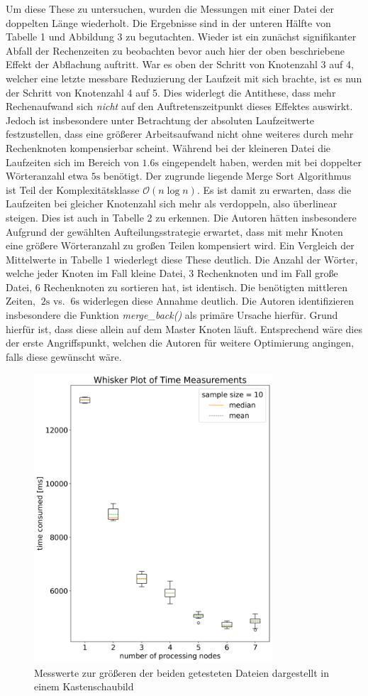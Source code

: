 Um diese These zu untersuchen, wurden die Messungen mit einer Datei der doppelten Länge wiederholt. Die Ergebnisse sind in der unteren Hälfte von Tabelle 1 und Abbildung 3 zu begutachten. Wieder ist ein zunächst signifikanter Abfall der Rechenzeiten zu beobachten bevor auch hier der oben beschriebene Effekt der Abflachung auftritt. War es oben der Schritt von Knotenzahl 3 auf 4, welcher eine letzte messbare Reduzierung der Laufzeit mit sich brachte, ist es nun der Schritt von Knotenzahl 4 auf 5. Dies widerlegt die Antithese, dass mehr Rechenaufwand sich \textit{nicht} auf den Auftretenszeitpunkt dieses Effektes auswirkt. Jedoch ist insbesondere unter Betrachtung der absoluten Laufzeitwerte festzustellen, dass eine größerer Arbeitsaufwand nicht ohne weiteres durch mehr Rechenknoten kompensierbar scheint. Während bei der kleineren Datei die Laufzeiten sich im Bereich von $1.6\mathrm{s}$ eingependelt haben, werden mit bei doppelter Wörteranzahl etwa $5\mathrm{s}$ benötigt. Der zugrunde liegende Merge Sort Algorithmus ist Teil der Komplexitätsklasse ${\mathcal{O}(n\log{n})}$. Es ist damit zu erwarten, dass die Laufzeiten bei gleicher Knotenzahl sich mehr als verdoppeln, also überlinear steigen. Dies ist auch in Tabelle 2 zu erkennen. Die Autoren hätten insbesondere Aufgrund der gewählten Aufteilungsstrategie erwartet, dass mit mehr Knoten eine größere Wörteranzahl zu großen Teilen kompensiert wird. Ein Vergleich der Mittelwerte in Tabelle 1 wiederlegt diese These deutlich. Die Anzahl der Wörter, welche jeder Knoten im Fall \glqq kleine Datei, 3 Rechenknoten\grqq{} und im Fall \glqq große Datei, 6 Rechenknoten\grqq{} zu sortieren hat, ist identisch. Die benötigten mittleren Zeiten, $~2\mathrm{s}$ vs. $~6\mathrm{s}$ widerlegen diese Annahme deutlich. Die Autoren identifizieren insbesondere die Funktion \textit{merge\_back()} als primäre Ursache hierfür. Grund hierfür ist, dass diese allein auf dem Master Knoten läuft. Entsprechend wäre dies der erste Angriffspunkt, welchen die Autoren für weitere Optimierung angingen, falls diese gewünscht wäre.\\
\begin{figure}[!t]
	\centering
	\includegraphics[width=3.5in]{boxplots_long.png}
	\caption{Messwerte zur größeren der beiden getesteten Dateien dargestellt in einem Kastenschaubild}
	\label{boxplot_times_long}
\end{figure}